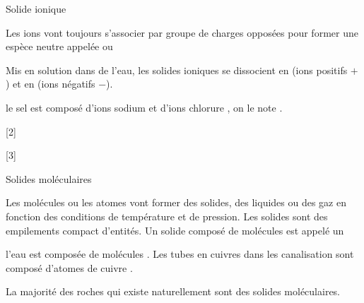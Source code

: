\begin{doc}{Solide ionique}
  \begin{importants}
    Les ions vont toujours s'associer par groupe de charges opposées pour former une espèce neutre appelée  ou 
  \end{importants}
  
  Mis en solution dans de l'eau, les solides ioniques se dissocient en  (ions positifs $+$) et en  (ions négatifs $-$).
  
  \exemple le sel est composé d'ions sodium  et d'ions chlorure \chlorure, on le note .
\end{doc}

\pasCorrection{\newpage \vspace*{-30pt}}
[2]

[3]



\vspace*{-4pt}
\begin{doc}{Solides moléculaires}
  \begin{figure}
    \vspace*{-32pt}
    \centering
  \end{figure}
  \strut\vspace*{-20pt}
  
  \begin{importants}
    Les molécules ou les atomes vont former des solides, des liquides ou des gaz en fonction des conditions de température et de pression.
    Les solides sont des empilements compact d'entités. Un solide composé de molécules est appelé un 
  \end{importants}
  \exemple* l'eau est composée de molécules .
  Les tubes en cuivres dans les canalisation sont composé d'atomes de cuivre .

  La majorité des roches qui existe naturellement sont des solides moléculaires.
\end{doc}

